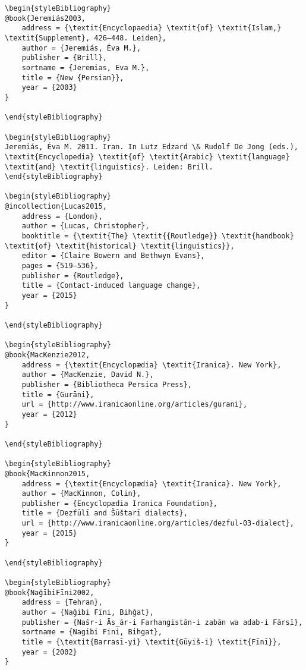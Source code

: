\documentclass[output=paper]{langsci/langscibook}
\begin{document}
\begin{verbatim}
\begin{styleBibliography}
@book{Jeremiás2003,
	address = {\textit{Encyclopaedia} \textit{of} \textit{Islam,} \textit{Supplement}, 426–448. Leiden},
	author = {Jeremiás, Éva M.},
	publisher = {Brill},
	sortname = {Jeremias, Eva M.},
	title = {New {Persian}},
	year = {2003}
}

\end{styleBibliography}

\begin{styleBibliography}
Jeremiás, Éva M. 2011. Iran. In Lutz Edzard \& Rudolf De Jong (eds.), \textit{Encyclopedia} \textit{of} \textit{Arabic} \textit{language} \textit{and} \textit{linguistics}. Leiden: Brill.
\end{styleBibliography}

\begin{styleBibliography}
@incollection{Lucas2015,
	address = {London},
	author = {Lucas, Christopher},
	booktitle = {\textit{The} \textit{{Routledge}} \textit{handbook} \textit{of} \textit{historical} \textit{linguistics}},
	editor = {Claire Bowern and Bethwyn Evans},
	pages = {519–536},
	publisher = {Routledge},
	title = {Contact-induced language change},
	year = {2015}
}

\end{styleBibliography}

\begin{styleBibliography}
@book{MacKenzie2012,
	address = {\textit{Encyclopædia} \textit{Iranica}. New York},
	author = {MacKenzie, David N.},
	publisher = {Bibliotheca Persica Press},
	title = {Gurāni},
	url = {http://www.iranicaonline.org/articles/gurani},
	year = {2012}
}

\end{styleBibliography}

\begin{styleBibliography}
@book{MacKinnon2015,
	address = {\textit{Encyclopædia} \textit{Iranica}. New York},
	author = {MacKinnon, Colin},
	publisher = {Encyclopædia Iranica Foundation},
	title = {Dezfūlī and Šūštarī dialects},
	url = {http://www.iranicaonline.org/articles/dezful-03-dialect},
	year = {2015}
}

\end{styleBibliography}

\begin{styleBibliography}
@book{NaǧībiFīni2002,
	address = {Tehran},
	author = {Naǧībi Fīni, Bihǧat},
	publisher = {Našr-i Ās̲ār-i Farhangistān-i zabān wa adab-i Fārsī},
	sortname = {Nagibi Fini, Bihgat},
	title = {\textit{Barrasī-yi} \textit{Gūyiš-i} \textit{Fīnī}},
	year = {2002}
}


\end{verbatim}
\end{document}
